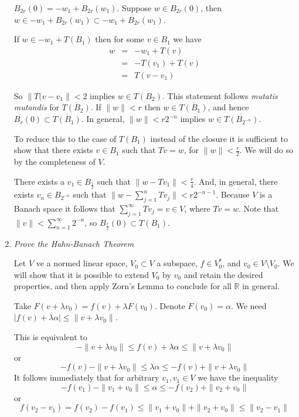 \documentclass[11pt]{article}
\begin{document}
\begin{enumerate}
$B_{2r}(0) = -w_1 + B_{2r}(w_1)$.  Suppose $w \in B_{2r}(0)$, then $w \in -w_1 + B_{2r}(w_1) \subset \overline{-w_1 + B_{2r}(w_1)}$.

If $w \in -w_1 + T(B_1)$ then for some $v \in B_1$ we have
\begin{eqnarray*}
w &=& -w_1 + T(v) \\
&=& -T(v_1) + T(v) \\
&=& T(v - v_1)
\end{eqnarray*}

So $\|T(v - v_1\| < 2$ implies $w \in T(B_2)$.  This statement follows \emph{mutatis mutandis} for $\overline{T(B_2)}$.  If $\|w\| < r$ then $w \in \overline{T(B_1)}$, and hence $B_r(0) \subset \overline{T(B_1)}$.  In general, $\|w\| < r2^{-n}$ implies $w \in \overline{T(B_{2^{-n}})}$.

To reduce this to the case of $T(B_1)$ instead of the closure it is sufficient to show that there exists $v \in  B_1$ such that $Tv = w$, for $\|w\| < \frac{r}{2}$.  We will do so by the completeness of $V$.

There exists a $v_1 \in B_{\frac{1}{2}}$ such that $\|w - Tv_1\| < \frac{r}{4}$.  And, in general, there exists $v_n \in B_{2^{-n}}$ such that $\|w - \sum_{j=1}^n Tv_j \| < r 2^{-n-1}$.  Because $V$ is a Banach space it follows that $\sum_{j=1}^\infty Tv_j = v \in V$, where $Tv = w$.  Note that $\|v\| < \sum_{n=1}^\infty 2^{-n}$, so $B_{\frac{r}{2}}(0) \subset T(B_1)$.

\item \emph{Prove the Hahn-Banach Theorem}

Let $V$ ve a normed linear space, $V_0 \subset V$ a subspace, $f \in V_0^{\ast}$, and $v_0 \in V \setminus V_0$.  We will show that it is possible to extend $V_0$ by $v_0$ and retain the desired properties, and then apply Zorn's Lemma to conclude for all $\mathbb{R}$ in general.

Take $F(v + \lambda v_0) = f(v) + \lambda F(v_0)$.  Denote $F(v_0) = \alpha$.  We need $|f(v) + \lambda \alpha | \leq \|v + \lambda v_0\|$.

This is equivalent to
\[
-\|v + \lambda v_0\| \leq f(v) + \lambda \alpha \leq \|v + \lambda v_0\|
\] 
or
\[
-f(v) -\|v + \lambda v_0\| \leq \lambda \alpha \leq -f(v) + \|v + \lambda v_0\|
\]
It follows immediately that for arbitrary $v_1,v_1 \in V$ we have the inequality
\[
-f(v_1) - \|v_1 + v_0\| \leq \alpha \leq -f(v_2) + \|v_2 + v_0\|
\]
or
\[
f(v_2-v_1) = f(v_2) - f(v_1) \leq \|v_1 + v_0\| + \|v_2 + v_0\| \leq \|v_2 - v_1\|
\]


\end{enumerate}
\end{document}
